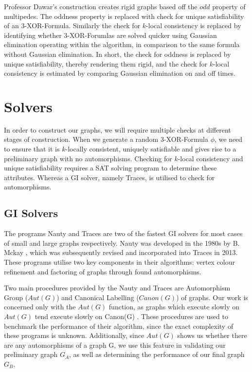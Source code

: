 Professor Dawar's construction creates rigid graphs based off the $odd$ property of multipedes. The oddness property is replaced with check for unique satisfiability of an 3-XOR-Formula. Similarly the check for $k$-local consistency is replaced by identifying whether 3-XOR-Forumlas are solved quicker using Gaussian elimination operating within the algorithm, in comparison to the same formula without Gaussian elimination. In short, the check for oddness is replaced by unique satisfiability, thereby rendering them rigid, and the check for $k$-local consistency is estimated by comparing Gaussian elimination on and off times.

\newpage
\section[Solvers]{Solvers}
In order to construct our graphs, we will require multiple checks at different stages of construction. When we generate a random 3-XOR-Formula $\phi$, we need to ensure that it is $k$-locally consistent, uniquely satisfiable and gives rise to a preliminary graph with no automorphisms.  Checking for $k$-local consistency and unique satisfiability requires a SAT solving program to determine these attributes. Whereas a GI solver, namely Traces, is utilised to check for automorphisms.

\subsection[GI Solvers]{GI Solvers}
The programs Nauty and Traces are two of the fastest GI solvers for most cases of small and large graphs respectively. Nauty  was developed in the 1980s by B. Mckay \cite{mckay1981practical}, which was subsequently revised and incorporated into Traces \cite{mckay2014practical} in 2013. These programs utilise two key components in their algorithms: vertex colour refinement and factoring of graphs through found automorphisms.

Two main procedures provided by the Nauty and Traces are Automorphism Group ($Aut(G)$) and Canonical Labelling ($Canon(G)$) of graphs. Our work is concerned only with the $Aut(G)$ function, as graphs which execute slowly on $Aut(G)$ tend execute slowly on Canon(G) \cite{mckay2014practical}. These procedures are used to benchmark the performance of their algorithm, since the exact complexity of these programs is unknown. Additionally, since $Aut(G)$ shows us whether there are any automorphisms of a graph G, we use this feature in validating our preliminary graph $G_A$, as well as determining the performance of our final graph $G_B$.

